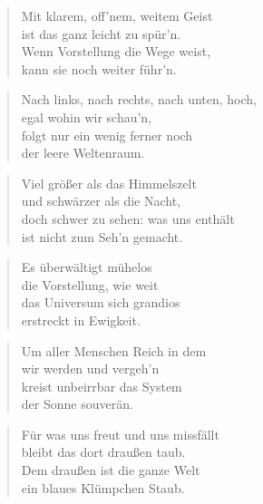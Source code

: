 \documentclass[10pt,a4paper]{article}
\begin{document}
\begin{multicols}{2}
\begin{verse}
Mit klarem, off’nem, weitem Geist \\
ist das ganz leicht zu spür’n. \\
Wenn Vorstellung die Wege weist, \\
kann sie noch weiter führ’n. \\
\end{verse}

\begin{verse}
Nach links, nach rechts, nach unten, hoch, \\
egal wohin wir schau’n, \\
folgt nur ein wenig ferner noch \\
der leere Weltenraum. \\
\end{verse}

\begin{verse}
Viel größer als das Himmelszelt \\
und schwärzer als die Nacht, \\
doch schwer zu sehen: was uns enthält \\
ist nicht zum Seh’n gemacht. \\
\end{verse}

\begin{verse}
Es überwältigt mühelos \\
die Vorstellung, wie weit \\
das Universum sich grandios \\
erstreckt in Ewigkeit. \\
\end{verse}

\begin{verse}
Um aller Menschen Reich in dem \\
wir werden und vergeh’n \\
kreist unbeirrbar das System \\
der Sonne souverän. \\
\end{verse}

\begin{verse}
Für was uns freut und uns missfällt \\
bleibt das dort draußen taub. \\
Dem draußen ist die ganze Welt \\
ein blaues Klümpchen Staub. \\
\end{verse}


\end{multicols}
\end{document}
